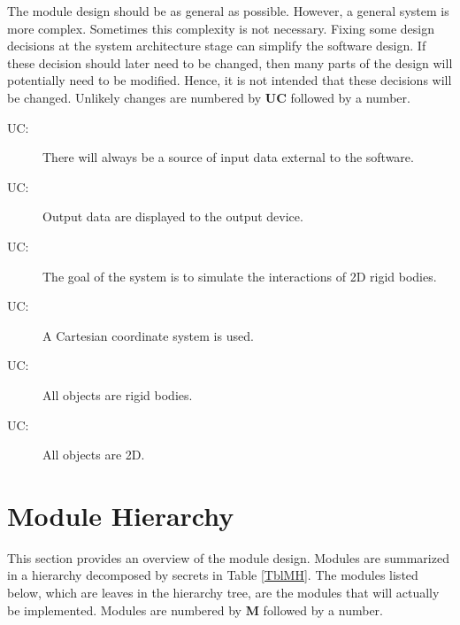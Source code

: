 \documentclass[12pt]{article}
\newcounter{ucnum}
\newcommand{\uctheucnum}{UC\theucnum}
\newcommand{\olu}[1]{\authornote{red}{OO}{#1}}
\begin{document}
The module design should be as general as possible. However, a general system is
more complex. Sometimes this complexity is not necessary. Fixing some design
decisions at the system architecture stage can simplify the software design. If
these decision should later need to be changed, then many parts of the design
will potentially need to be modified. Hence, it is not intended that these
decisions will be changed.  Unlikely changes are numbered by \textbf{UC}
followed by a number.

\begin{description}
\item[ \uctheucnum \label{ucInput}:] There will always be a source of input data external to the software.
\item[ \uctheucnum \label{ucOutput}:] Output data are
  displayed to the output device.
\item[ \uctheucnum \label{ucGoal}:] The goal of the system is to simulate the interactions of 2D rigid bodies.
\item[ \uctheucnum \label{ucCartesian}:] A Cartesian 
coordinate system is used.
\item[ \uctheucnum \label{ucRigid}:] All objects
are rigid bodies.
\item[ \uctheucnum \label{uc2D}:] All objects
are 2D.
\end{description}

\section{Module Hierarchy} \label{SecMH}

This section provides an overview of the module design. Modules are summarized
in a hierarchy decomposed by secrets in Table \ref{TblMH}. The modules listed
below, which are leaves in the hierarchy tree, are the modules that will
actually be implemented.  Modules are numbered by \textbf{M}
followed by a number.
\end{document}
